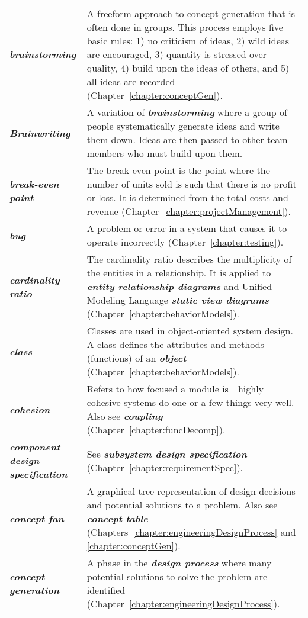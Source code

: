 \begin{longtable} { p{4cm} p{11cm}}
\emph{\textbf{brainstorming}} & A freeform approach to concept
generation that is often done in groups. This process employs five basic
rules: 1) no criticism of ideas, 2) wild ideas are encouraged, 3)
quantity is stressed over quality, 4) build upon the ideas of others,
and 5) all ideas are recorded (Chapter~\ref{chapter:conceptGen}). \\
\emph{\textbf{Brainwriting}} & A variation of
\emph{\textbf{brainstorming}} where a group of people systematically
generate ideas and write them down. Ideas are then passed to other team
members who must build upon them. \\
\emph{\textbf{break-even point}} & The break-even point is the point
where the number of units sold is such that there is no profit or loss.
It is determined from the total costs and revenue (Chapter~\ref{chapter:projectManagement}). \\
\emph{\textbf{bug}} & A problem or error in a system that causes it to
operate incorrectly (Chapter~\ref{chapter:testing}). \\
\emph{\textbf{cardinality ratio}} & The cardinality ratio describes the
multiplicity of the entities in a relationship. It is applied to
\emph{\textbf{entity relationship diagrams}} and Unified Modeling
Language \emph{\textbf{static view diagrams}} (Chapter~\ref{chapter:behaviorModels}). \\
\emph{\textbf{class}} & Classes are used in object-oriented system
design. A class defines the attributes and methods (functions) of an
\emph{\textbf{object}} (Chapter~\ref{chapter:behaviorModels}). \\
\emph{\textbf{cohesion}} & Refers to how focused a module is---highly
cohesive systems do one or a few things very well. Also see
\emph{\textbf{coupling}} (Chapter~\ref{chapter:funcDecomp}). \\
\emph{\textbf{component design specification}} & See
\emph{\textbf{subsystem design specification}} (Chapter~\ref{chapter:requirementSpec}). \\
\emph{\textbf{concept fan}} & A graphical tree representation of design
decisions and potential solutions to a problem. Also see
\emph{\textbf{concept table}} (Chapters~\ref{chapter:engineeringDesignProcess} and 
\ref{chapter:conceptGen}). \\
\emph{\textbf{concept generation}} & A phase in the \emph{\textbf{design
process}} where many potential solutions to solve the problem are
identified (Chapter~\ref{chapter:engineeringDesignProcess}). \\

\end{longtable}
